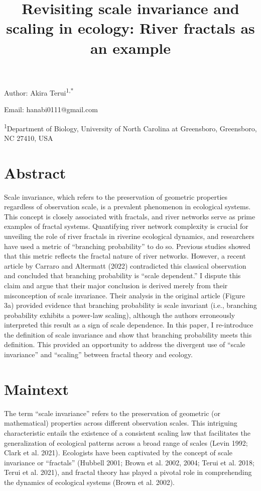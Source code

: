 \documentclass[
  12pt,
]{article}
\title{Revisiting scale invariance and scaling in ecology: River fractals as an example}
\author{}
\date{\vspace{-2.5em}}
\begin{document}
\maketitle

Author: Akira Terui\textsuperscript{1,*}

Email: hanabi0111@gmail.com

\textsuperscript{1}Department of Biology, University of North Carolina at Greensboro, Greensboro, NC 27410, USA

\hypertarget{abstract}{%
\section{Abstract}\label{abstract}}

Scale invariance, which refers to the preservation of geometric properties regardless of observation scale, is a prevalent phenomenon in ecological systems. This concept is closely associated with fractals, and river networks serve as prime examples of fractal systems. Quantifying river network complexity is crucial for unveiling the role of river fractals in riverine ecological dynamics, and researchers have used a metric of ``branching probability'' to do so. Previous studies showed that this metric reflects the fractal nature of river networks. However, a recent article by Carraro and Altermatt (2022) contradicted this classical observation and concluded that branching probability is ``scale dependent.'' I dispute this claim and argue that their major conclusion is derived merely from their misconception of scale invariance. Their analysis in the original article (Figure 3a) provided evidence that branching probability is scale invariant (i.e., branching probability exhibits a power-law scaling), although the authors erroneously interpreted this result as a sign of scale dependence. In this paper, I re-introduce the definition of scale invariance and show that branching probability meets this definition. This provided an opportunity to address the divergent use of ``scale invariance'' and ``scaling'' between fractal theory and ecology.

\hypertarget{maintext}{%
\section{Maintext}\label{maintext}}

The term ``scale invariance'' refers to the preservation of geometric (or mathematical) properties across different observation scales. This intriguing characteristic entails the existence of a consistent scaling law that facilitates the generalization of ecological patterns across a broad range of scales (Levin 1992; Clark et al. 2021). Ecologists have been captivated by the concept of scale invariance or ``fractals'' (Hubbell 2001; Brown et al. 2002, 2004; Terui et al. 2018; Terui et al. 2021), and fractal theory has played a pivotal role in comprehending the dynamics of ecological systems (Brown et al. 2002).
\end{document}
